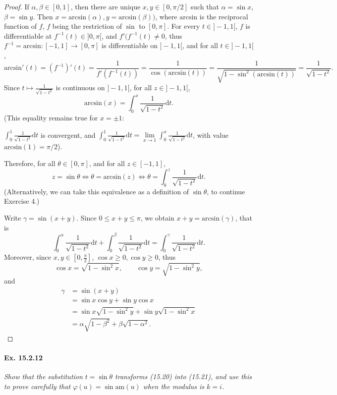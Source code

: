 \documentclass[11pt,a4paper]{article}
\newcommand{\D}{\mathrm{d}}
\begin{document}
\begin{proof} If $\alpha, \beta \in [0,1]$, then there are unique $x,y \in [0,\pi/2]$ such that $\alpha = \sin x$, $\beta = \sin y$. Then $x = \mathrm{arcsin}(\alpha), y = \mathrm{arcsin}(\beta))$, where $\mathrm{arcsin}$ is the reciprocal function of $f$, $f$ being the restriction of $\sin$ to $[0,\pi]$. For every $t \in ]-1,1[$, $f$ is differentiable at $f^{-1}(t) \in ]0,\pi[$, and $f'(f^{-1}(t) \ne 0$, thus $f^{-1} = \mathrm{arcsin} :[-1,1] \to [0,\pi]$ is differentiable on $]-1,1[$, and for all $t \in ]-1,1[$,
$$\mathrm{arcsin}'(t) = (f^{-1})'(t) = \frac{1}{f'(f^{-1}(t))} = \frac{1}{\cos( \mathrm{arcsin}(t))} = \frac{1}{\sqrt{1 - \sin^2(\mathrm{arcsin}(t))}} = \frac{1}{\sqrt{1 -t^2}}.$$
Since $t \mapsto  \frac{1}{\sqrt{1-t^2}}$ is continuous on $]-1,1[$, for all $z \in ]-1,1[$,
$$\mathrm{arcsin}(x) = \int_0^x  \frac{1}{\sqrt{1-t^2}} \D t.$$
(This equality remains true for $x = \pm 1$: 

$\int_0^1  \frac{1}{\sqrt{1-t^2}} \D t$ is convergent, and $ \int_0^1  \frac{1}{\sqrt{1-t^2}} \D t = \lim\limits_{x \to 1} \int_0^x  \frac{1}{\sqrt{1-t^2}} \D t$, with value $\mathrm{arcsin}(1) = \pi/2$).

Therefore, for all $\theta \in [0,\pi]$, and for all $z \in [-1,1]$,
$$  z = \sin \theta \iff  \theta= \mathrm{arcsin}(z) \iff \theta = \int_0^z  \frac{1}{\sqrt{1-t^2}} \D t.$$
(Alternatively, we can take this equivalence as a definition of $\sin \theta$, to continue Exercise 4.)

Write $\gamma =\sin(x+y)$. Since $0 \leq x+y \leq \pi$, we obtain $x+y =\mathrm{arcsin}(\gamma)$, that is
$$\int_0^\alpha \frac{1}{\sqrt{1-t^2}} \D t + \int_0^\beta \frac{1}{\sqrt{1-t^2}} \D t = \int_0^\gamma \frac{1}{\sqrt{1-t^2}} \D t.$$
Moreover, since $x,y \in [0,\frac{\pi}{2}]$, $\cos x \geq 0, \cos y \geq 0$, thus 
$$\cos x = \sqrt{1- \sin^2 x}, \qquad \cos y = \sqrt{1-\sin^2 y},$$
and
\begin{align*}
\gamma &= \sin(x+y)\\
&=\sin x \cos y + \sin y \cos x\\
&=\sin x \sqrt{1-\sin^2 y}+ \sin y \sqrt{1-\sin^2 x}\\
&=  \alpha \sqrt{1-\beta^2} + \beta \sqrt{1- \alpha^2}.
\end{align*}
\end{proof}

\paragraph{Ex. 15.2.12}{\it Show that the substitution $t = \sin \theta$ transforms (15.20) into (15.21), and use this to prove carefully that $\varphi(u) = \sin \mathrm{am}(u)$ when the modulus is $k = i$.
}
\end{document}
